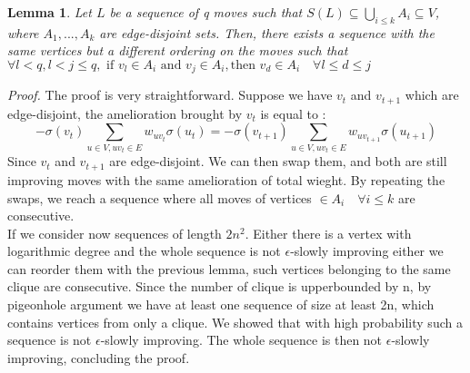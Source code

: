 \documentclass[12pt]{article}
\newtheorem{lemma}[theorem]{Lemma}
\begin{document}
\begin{lemma}
\label{edgeDisjoint}
Let $L$ be a sequence of q moves such that $S(L) \subseteq \bigcup_{i \leq k}A_i  \subseteq V$, where $A_1, ... , A_k$ are edge-disjoint sets. Then, there exists a sequence with the same vertices but a different ordering on the moves such that $\forall l < q, l < j \leq q, \text{ if } v_l \in A_i \text{ and } v_j \in A_i, \text{then } v_d \in A_i \quad\forall l \leq d  \leq j$   
\end{lemma}
\textit{Proof.} The proof is very straightforward. Suppose we have $v_t$ and $v_{t+1}$ which are edge-disjoint, the amelioration brought by $v_t$ is equal to :
\begin{equation*}
-\sigma(v_t) \sum_{u \in V, uv_t \in E}w_{uv_t}\sigma(u_t) = -\sigma(v_{t+1}) \sum_{u \in V, uv_t \in E}w_{uv_{t+1}}\sigma(u_{t + 1}) 
\end{equation*}
Since $v_t$ and $v_{t+1}$ are edge-disjoint. We can then swap them, and both are still improving moves with the same amelioration of total wieght. By repeating the swaps, we reach a sequence where all moves of vertices $\in A_i \quad \forall i \leq k$ are consecutive.\\

If we consider now sequences of length $2n^2$. Either there is a vertex with logarithmic degree and the whole sequence is not $\epsilon$-slowly improving either we can reorder them with the previous lemma, such vertices belonging to the same clique are consecutive. Since the number of clique is upperbounded by n, by pigeonhole argument we have at least one sequence of size at least 2n, which contains vertices from only a clique. We showed that with high probability such a sequence is not $\epsilon$-slowly improving. The whole sequence is then not $\epsilon$-slowly improving, concluding the proof.



\end{document}
